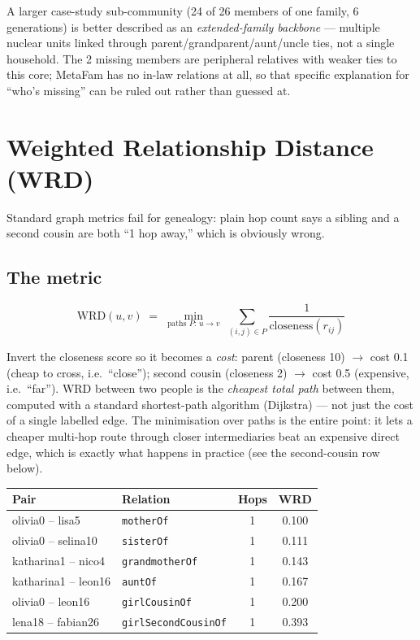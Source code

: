 \documentclass[11pt,a4paper]{article}
\newcommand{\rel}[1]{\texttt{\small #1}}
\begin{document}
A larger case-study sub-community (24 of 26 members of one family, 6
generations) is better described as an \emph{extended-family backbone} ---
multiple nuclear units linked through parent/grandparent/aunt/uncle ties,
not a single household. The 2 missing members are peripheral relatives
with weaker ties to this core; MetaFam has no in-law relations at all, so
that specific explanation for ``who's missing'' can be ruled out rather
than guessed at.

\section{Weighted Relationship Distance (WRD)}

Standard graph metrics fail for genealogy: plain hop count says a sibling
and a second cousin are both ``1 hop away,'' which is obviously wrong.

\subsection{The metric}

\[
\mathrm{WRD}(u,v) \;=\; \min_{\text{paths } P:\, u \to v} \;
\sum_{(i,j)\in P} \frac{1}{\mathrm{closeness}(r_{ij})}
\]

Invert the closeness score so it becomes a \emph{cost}: parent
(closeness 10) $\to$ cost 0.1 (cheap to cross, i.e.\ ``close''); second
cousin (closeness 2) $\to$ cost 0.5 (expensive, i.e.\ ``far''). WRD
between two people is the \emph{cheapest total path} between them,
computed with a standard shortest-path algorithm (Dijkstra) --- not just
the cost of a single labelled edge. The minimisation over paths is the
entire point: it lets a cheaper multi-hop route through closer
intermediaries beat an expensive direct edge, which is exactly what
happens in practice (see the second-cousin row below).

\begin{center}
\begin{tabular}{llcc}
\toprule
\textbf{Pair} & \textbf{Relation} & \textbf{Hops} & \textbf{WRD} \\
\midrule
olivia0 -- lisa5 & \rel{motherOf} & 1 & 0.100 \\
olivia0 -- selina10 & \rel{sisterOf} & 1 & 0.111 \\
katharina1 -- nico4 & \rel{grandmotherOf} & 1 & 0.143 \\
katharina1 -- leon16 & \rel{auntOf} & 1 & 0.167 \\
olivia0 -- leon16 & \rel{girlCousinOf} & 1 & 0.200 \\
lena18 -- fabian26 & \rel{girlSecondCousinOf} & 1 & 0.393 \\
\bottomrule
\end{tabular}
\end{center}
\end{document}
